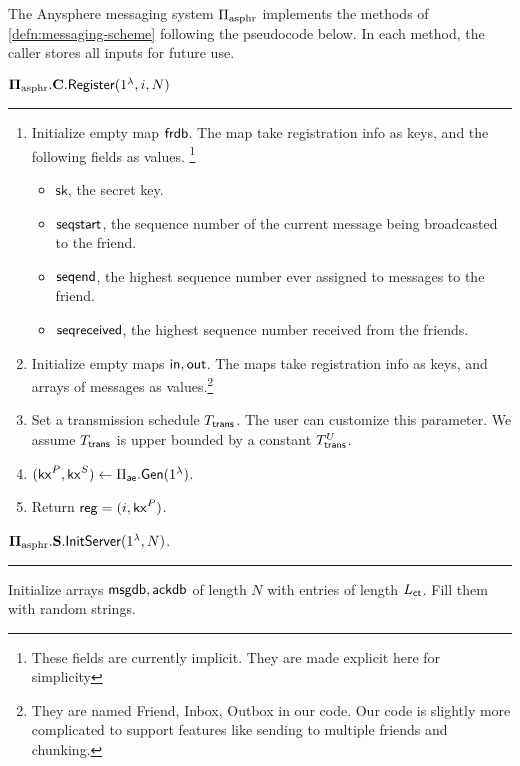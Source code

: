 \begin{definition}
\label{defn:asphr-code}
The Anysphere messaging system $\Pi_{\text{asphr}}$ implements the methods of \cref{defn:messaging-scheme} following the pseudocode below. In each method, the caller stores all inputs for future use.
\vspace{10pt}

$\mathbf{\Pi_{\text{asphr}}.C.\mathsf{Register}}(1^{\lambda}, i, N)$
\vspace{5pt}
\hrule
\vspace{5pt}
\begin{enumerate}
    \item Initialize empty map $\mathsf{frdb}$. The map take registration info as keys, and the following fields as values.    \footnote{These fields are currently implicit. They are made explicit here for simplicity}
    \begin{itemize}
        \item $\mathsf{sk}$, the secret key.
        \item $\mathsf{seqstart}$, the sequence number of the current message being broadcasted to the friend.
        \item $\mathsf{seqend}$, the highest sequence number ever assigned to messages to the friend.
        \item $\mathsf{seqreceived}$, the highest sequence number received from the friends.
    \end{itemize}

    \item Initialize empty maps $\mathsf{in}, \mathsf{out}$. The maps take registration info as keys, and arrays of messages as values.\footnote{They are named Friend, Inbox, Outbox in our code. Our code is slightly more complicated to support features like sending to multiple friends and chunking.}
    \item Set a transmission schedule $T_{\mathsf{trans}}$. The user can customize this parameter. We assume $T_{\mathsf{trans}}$ is upper bounded by a constant $T_{\mathsf{trans}}^U$.
    \item $(\mathsf{kx}^P, \mathsf{kx}^S) \leftarrow \Pi_{\mathsf{ae}}.\mathsf{Gen}(1^{\lambda})$. 
    \item Return $\mathsf{reg} = (i, \mathsf{kx}^P)$.
\end{enumerate}
\vspace{10pt}
$\mathbf{\Pi_{\text{asphr}}.S.\mathsf{InitServer}}(1^{\lambda}, N)$.
\vspace{5pt}
\hrule
\vspace{5pt}
Initialize arrays $\mathsf{msgdb}, \mathsf{ackdb}$ of length $N$ with entries of length $L_{\mathsf{ct}}$. Fill them with random strings.


\end{definition}
